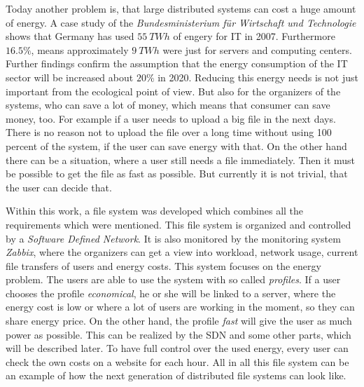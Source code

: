 Today another problem is, that large distributed systems can cost a huge amount of energy. A case study of the \textit{Bundesministerium f\"ur Wirtschaft und Technologie} shows that Germany has used $55\ TWh$ of engery for IT in 2007\cite{bmwi}. Furthermore $16.5 \%$, means approximately $9\ TWh$ were just for servers and computing centers. Further findings confirm the assumption that the energy consumption of the IT sector will be increased about $20 \%$ in 2020. Reducing this energy needs is not just important from the ecological point of view. But also for the organizers of the systems, who can save a lot of money, which means that consumer can save money, too. For example if a user needs to upload a big file in the next days. There is no reason not to upload the file over a long time without using 100 percent of the system, if the user can save energy with that. On the other hand there can be a situation, where a user still needs a file immediately. Then it must be possible to get the file as fast as possible. But currently it is not trivial, that the user can decide that.  

Within this work, a file system was developed which combines all the requirements which were mentioned. This file system is organized and controlled by a \textit{Software Defined Network}. It is also monitored by the monitoring system \textit{Zabbix}, where the organizers can get a view into workload, network usage, current file transfers of users and energy costs. This system focuses on the energy problem. The users are able to use the system with so called \textit{profiles}. If a user chooses the profile \textit{economical}, he or she will be linked to a server, where the energy cost is low or where a lot of users are working in the moment, so they can share energy price. On the other hand, the profile \textit{fast} will give the user as much power as possible. This can be realized by the SDN and some other parts, which will be described later. To have full control over the used energy, every user can check the own costs on a website for each hour. All in all this file system can be an example of how the next generation of distributed file systems can look like.               